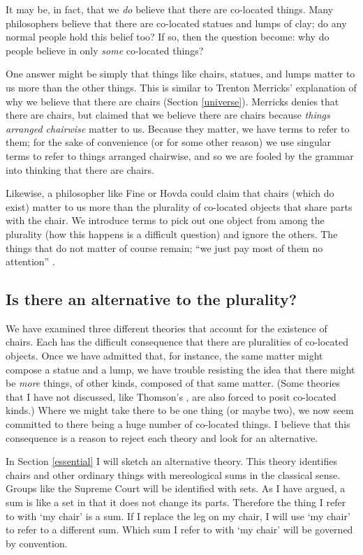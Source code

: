 \documentclass[12pt,twoside]{reedfancy}
\begin{document}
\begin{spacing}{1.25}
It may be, in fact, that we {\em do} believe that there are co-located
things.  Many philosophers believe that there are co-located statues
and lumps of clay; do any normal people hold this belief too?
If so, then the question become: why do people believe in only {\em
  some} co-located things?

One answer might be simply that things like chairs, statues, and lumps
matter to us more than the other things.  This is similar to Trenton
Merricks' explanation of why we believe that there are chairs (Section
\ref{universe}).  Merricks denies that there are chairs, but claimed
that we believe there are chairs because {\em things arranged
  chairwise} matter to us.  Because they matter, we have terms to
refer to them; for the sake of convenience (or for some other reason)
we use singular terms to refer to things arranged chairwise, and so we
are fooled by the grammar into thinking that there are chairs.

Likewise, a philosopher like Fine or Hovda could claim that chairs
(which do exist) matter to us more than the plurality of co-located
objects that share parts with the chair.  We introduce terms to pick
out one object from among the plurality (how this happens is a
difficult question) and ignore the others.  The things that do not
matter of course remain; ``we just pay most of them no attention''
\citep[356]{bennett2004}.

\subsection{Is there an alternative to the plurality?}
We have examined three different theories that account for the
existence of chairs.  Each has the difficult consequence that there
are pluralities of co-located objects.  Once we have admitted that,
for instance, the same matter might compose a statue and a lump, we
have trouble resisting the idea that there might be {\em more} things,
of other kinds, composed of that same matter.  (Some theories that I
have not discussed, like Thomson's \citeyearpar{thomson1998a}, are
also forced to posit co-located kinds.)  Where we might take there to
be one thing (or maybe two), we now seem committed to there being a
huge number of co-located things.  I believe that this consequence is
a reason to reject each theory and look for an alternative.

In Section \ref{essential} I will sketch an alternative theory.  This
theory identifies chairs and other ordinary things with mereological
sums in the classical sense.  Groups like the Supreme Court will be
identified with sets.  As I have argued, a sum is like a set in that
it does not change its parts.  Therefore the thing I refer to with `my
chair' is a sum.  If I replace the leg on my chair, I will use `my
chair' to refer to a different sum.  Which sum I refer to with `my
chair' will be governed by convention.



\end{spacing}
\end{document}

